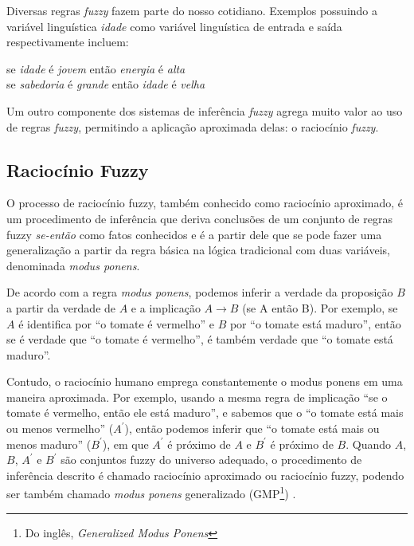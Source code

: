 Diversas regras \textit{fuzzy} fazem parte do nosso cotidiano. Exemplos possuindo a variável linguística \textit{idade} como variável linguística de entrada e saída respectivamente incluem:
\begin{center}
se \textit{idade} é \textit{jovem} então \textit{energia} é \textit{alta} \\
se \textit{sabedoria} é \textit{grande} então \textit{idade} é \textit{velha}
\end{center}

Um outro componente dos sistemas de inferência \textit{fuzzy} agrega muito valor ao uso de regras \textit{fuzzy}, permitindo a aplicação aproximada delas: o raciocínio \textit{fuzzy}.

\subsection{Raciocínio Fuzzy}
\label{sec:raciocinio_fuzzy}

O processo de raciocínio fuzzy, também conhecido como raciocínio aproximado, é um procedimento de inferência que deriva conclusões de um conjunto de regras fuzzy \textit{se-então} como fatos conhecidos \cite[p.~62]{Jang1997} e é a partir dele que se pode fazer uma generalização a partir da regra básica na lógica tradicional com duas variáveis, denominada \textit{modus ponens}.

De acordo com a regra \textit{modus ponens}, podemos inferir a verdade da proposição $B$ a partir da verdade de $A$ e a implicação $A \rightarrow B$ (se A então B). Por exemplo, se $A$ é identifica por ``o tomate é vermelho'' e $B$ por ``o tomate está maduro'', então se é verdade que ``o tomate é vermelho'', é também verdade que ``o tomate está maduro''.

Contudo, o raciocínio humano emprega constantemente o modus ponens em uma maneira aproximada. Por exemplo, usando a mesma regra de implicação ``se o tomate é vermelho, então ele está maduro'', e sabemos que o ``o tomate está mais ou menos vermelho'' ($A^\prime$), então podemos inferir que ``o tomate está mais ou menos maduro'' ($B^\prime$), em que $A^\prime$ é próximo de $A$ e $B^\prime$ é próximo de $B$. Quando $A$, $B$, $A^\prime$ e $B^\prime$ são conjuntos fuzzy do universo adequado, o procedimento de inferência descrito é chamado raciocínio aproximado ou raciocínio fuzzy, podendo ser também chamado \textit{modus ponens} generalizado (GMP\footnote{Do inglês, \textit{Generalized Modus Ponens}}) \cite[p.~65]{Jang1997}.


